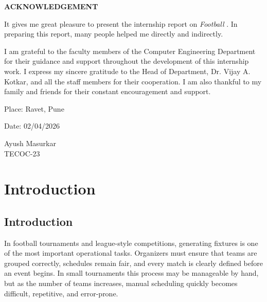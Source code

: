 \documentclass[12pt,a4paper]{report}
\begin{document}

\newpage
\begin{center}
{\Large \textbf{ACKNOWLEDGEMENT}}
\end{center}

\vspace{0.5cm}

It gives me great pleasure to present the internship report on \textit{Football }. In preparing this report, many people helped me directly and indirectly.

I am grateful to the faculty members of the Computer Engineering Department for their guidance and support throughout the development of this internship work. I express my sincere gratitude to the Head of Department, Dr. Vijay A. Kotkar, and all the staff members for their cooperation. I am also thankful to my family and friends for their constant encouragement and support.

\vspace{2cm}

Place: Ravet, Pune

Date: 02/04/2026

\vspace{1cm}

\begin{flushright}
Ayush Masurkar \\
TECOC-23
\end{flushright}


\newpage
\tableofcontents


\newpage
\listoffigures


\chapter{Introduction}

\section{Introduction}
In football tournaments and league-style competitions, generating fixtures is one of the most important operational tasks. Organizers must ensure that teams are grouped correctly, schedules remain fair, and every match is clearly defined before an event begins. In small tournaments this process may be manageable by hand, but as the number of teams increases, manual scheduling quickly becomes difficult, repetitive, and error-prone.
\end{document}
